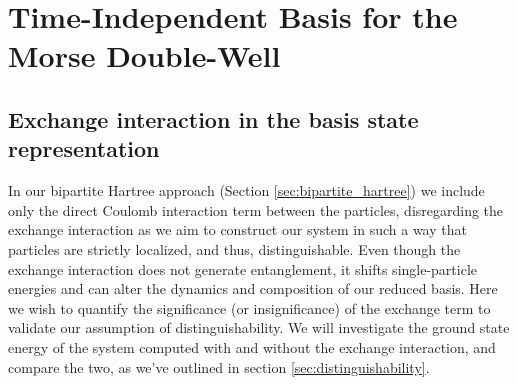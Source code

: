\documentclass{subfiles}
\begin{document}
\section{Time-Independent Basis for the Morse Double-Well}\label{sec:time_independent_basis}


\subsection{Exchange interaction in the basis state representation}
In our bipartite Hartree approach (Section \ref{sec:bipartite_hartree}) we include only the direct Coulomb interaction term between the particles, disregarding the exchange interaction as we aim to construct our system in such a way that particles are strictly localized, and thus, distinguishable. Even though the exchange interaction does not generate entanglement, it shifts single-particle energies and can alter the dynamics and composition of our reduced basis. Here we wish to quantify the significance (or insignificance) of the exchange term to validate our assumption of distinguishability. We will investigate the ground state energy of the system computed with and without the exchange interaction, and compare the two, as we've outlined in section \ref{sec:distinguishability}. \\ 
\end{document}
